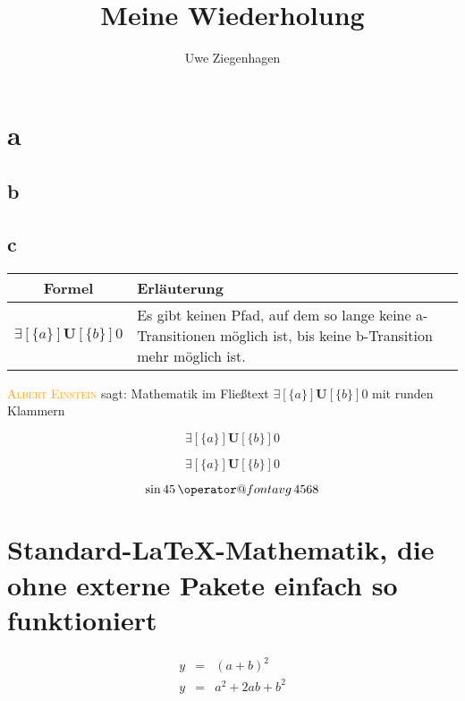\documentclass[parskip=half]{scrartcl}
\author{Uwe Ziegenhagen}
\title{Meine Wiederholung}
\makeatletter
\newcommand{\avg}{\mathop{\operator@font avg}}
\newcommand{\person}[1]{\textcolor{orange}{\textsc{#1}}}
\makeatother
\begin{document}
\maketitle

\tableofcontents

\section{a}
\subsection{b}
\subsection{c}

\blindtext[5]


\begin{table}[ht]
\begin{center}
\begin{tabular}{cp{}} \toprule
\textbf{Formel} & \textbf{Erläuterung} \\ \midrule
\( \exists[\{a\}]\mathbf{U} [\{b\}]0 \) & Es gibt keinen Pfad, auf dem so lange keine a-Transitionen möglich ist, bis keine b-Transition mehr möglich ist.\\
\end{tabular}
\end{center}
\end{table}

\person{Albert Einstein} sagt: 
Mathematik im Fließtext \( \exists[\{a\}]\mathbf{U} [\{b\}]0 \)  mit runden Klammern 

\[ \exists[\{a\}]\mathbf{U} [\{b\}]0 \]

\begin{equation}
\exists[\{a\}]\mathbf{U} [\{b\}]0
\end{equation}

\begin{equation}
\sin 45 \avg 4568
\end{equation}

\section[Standard-\LaTeX-Mathematik]{Standard-\LaTeX-Mathematik, die ohne externe Pakete einfach so funktioniert}

\begin{eqnarray} %
y &=& (a + b)^2 \\
y &=& a^2 + 2ab +b^2
\end{eqnarray}
\end{document}
